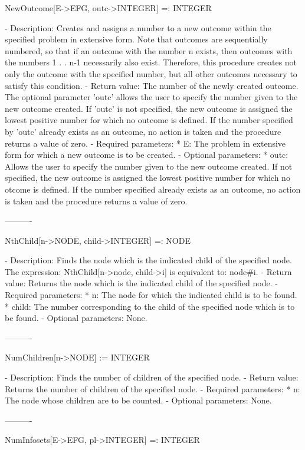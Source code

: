 NewOutcome[E->EFG, {outc->INTEGER}] =: INTEGER

   -	Description:  Creates and assigns a number to a new outcome within the
	specified problem in extensive form.  Note that outcomes are 
	sequentially numbered, so that if an outcome with the number n exists,
	then outcomes with the numbers 1 . . n-1 necessarily also exist.
	Therefore, this procedure creates not only the outcome with the 
	specified number, but all other outcomes necessary to satisfy this 
	condition.
   -	Return value:  The number of the newly created outcome.  The optional 
	parameter 'outc' allows the user to specify the number given to the new
	outcome created.  If 'outc' is not specified, the new outcome is 
	assigned the lowest positive number for which no outcome is defined.  
	If the number specified by 'outc' already exists as an outcome, no 
	action is taken and the procedure returns a value of zero.
   -	Required parameters:
	  *  E:  The problem in extensive form for which a new outcome is to
	     be created.
   -	Optional parameters:
	  *  outc:  Allows the user to specify the number given to the new 
	     outcome created.  If not specified, the new outcome is assigned
	     the lowest positive number for which no otcome is defined.  If the
	     number specified already exists as an outcome, no action is taken
	     and the procedure returns a value of zero.

----------

NthChild[n->NODE, child->INTEGER] =: NODE

   -	Description:  Finds the node which is the indicated child of the 
	specified node.  The expression:  NthChild[n->node, child->i] is 
	equivalent to:  node\#i.
   -	Return value:  Returns the node which is the indicated child of the
	specified node.
   -	Required parameters:
	  *  n:  The node for which the indicated child is to be found.
	  *  child:  The number corresponding to the child of the specified 
		node which is to be found.
   -	Optional parameters:  None.

----------

NumChildren[n->NODE] := INTEGER

   -	Description:  Finds the number of children of the specified node.
   -	Return value:  Returns the number of children of the specified node.
   -	Required parameters:
	  *  n:  The node whose children are to be counted.
   -	Optional parameters:  None.

----------

NumInfosets[E->EFG, pl->INTEGER] =: INTEGER

